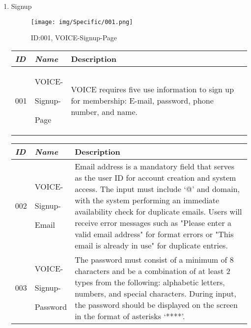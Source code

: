\documentclass[conference]{IEEEtran}
\begin{document}
\begin{enumerate}[label=\arabic*]
    \item Signup\par
    \vspace{0.3em}

    \begin{figure}[h]
        \centering
        \texttt{[image: img/Specific/001.png]}
        \caption{ID:001, VOICE-Signup-Page}
    \end{figure}

    \begin{table}[h]
    \def\arraystretch{1.2} \small
        \begin{tabular}{|p{1cm}|p{1.8cm}|p{4.8cm}|}
        \hline
            \textit{\textbf{ID}} & \textit{\textbf{Name}} & {\textbf{Description}} \\
        \hline
            001 \par & VOICE-\par Signup-\par Page & VOICE requires five use information to sign up for membership: E-mail, password, phone number, and name. \\ 
        \hline
        \end{tabular}
    \end{table}

    \vspace{2em}

    \begin{table}[h]
    \def\arraystretch{1.2} \small
        \begin{tabular}{|p{1cm}|p{1.8cm}|p{4.8cm}|}
        \hline
            \textit{\textbf{ID}} & \textit{\textbf{Name}} & {\textbf{Description}} \\
        \hline    
            002 \par & VOICE-\par Signup-\par Email & Email address is a mandatory field that serves as the user ID for account creation and system access. The input must include ‘@’ and domain, with the system performing an immediate availability check for duplicate emails. Users will receive error messages such as "Please enter a valid email address" for format errors or "This email is already in use" for duplicate entries. \\
        \hline 
            003 \par & VOICE-\par Signup-\par Password & The password must consist of a minimum of 8 characters and be a combination of at least 2 types from the following: alphabetic letters, numbers, and special characters. During input, the password should be displayed on the screen in the format of asterisks ‘****’. \\
        \hline 
        \end{tabular}
    \end{table}


\end{enumerate}
\end{document}
